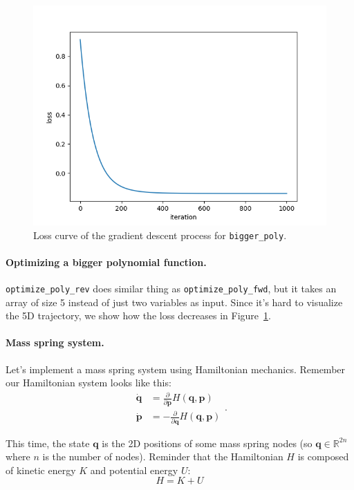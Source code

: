 \begin{figure}
\centering
\includegraphics[width=0.8\linewidth]{imgs/loss-bigger-poly.png}
\caption{Loss curve of the gradient descent process for \lstinline{bigger_poly}.}
\label{fig:optimize}
\end{figure}

\paragraph{Optimizing a bigger polynomial function.} \lstinline{optimize_poly_rev} does similar thing as \lstinline{optimize_poly_fwd}, but it takes an array of size 5 instead of just two variables as input. Since it's hard to visualize the 5D trajectory, we show how the loss decreases in Figure~\ref{fig:optimize}.

\paragraph{Mass spring system.} Let's implement a mass spring system using Hamiltonian mechanics. Remember our Hamiltonian system looks like this:
\begin{equation}
\begin{aligned}
\dot{\mathbf{q}} &= \frac{\partial}{\partial \mathbf{p}} H(\mathbf{q}, \mathbf{p}) \\
\dot{\mathbf{p}} &= -\frac{\partial}{\partial \mathbf{q}} H(\mathbf{q}, \mathbf{p})
\end{aligned}.
\end{equation}

This time, the state $\mathbf{q}$ is the 2D positions of some mass spring nodes (so $\mathbf{q} \in \mathbb{R}^{2n}$ where $n$ is the number of nodes). Reminder that the Hamiltonian $H$ is composed of kinetic energy $K$ and potential energy $U$:
\begin{equation}
H = K + U
\end{equation}


